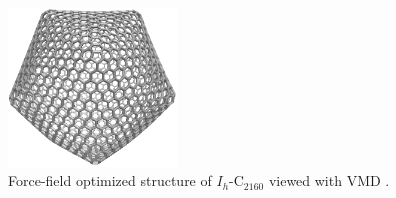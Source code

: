 \documentclass[article,a4paper,twoside]{memoir}
\newcommand{\C}[1]{\ensuremath{\mathrm{C}_{#1}}}
\begin{document}
 \begin{figure}[htbp]
	\centering
  		 \includegraphics[width=0.4\textwidth]{C2160.png}
     \caption{Force-field optimized structure of $I_h$-\C{2160} viewed with VMD \cite{vmd}.}
     \label{pic:Finalgraph}
 \end{figure}


\end{document}
